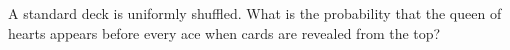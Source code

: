A standard deck is uniformly shuffled. What is the probability that the queen of hearts appears before every ace when cards are revealed from the top?
